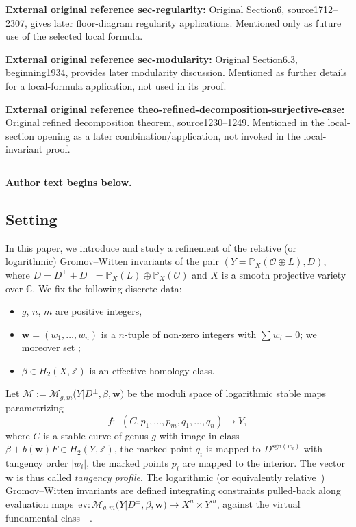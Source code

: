 \documentclass[11pt]{article}
\numberwithin{equation}{section}
\newcommand{\vir}[1]{\big[#1\big]^\mathrm{vir}}
\newcommand{\ev}{\mathrm{ev}}
\newcommand{\PP}{\mathbb{P}}
\newcommand{\ZZ}{\mathbb{Z}}
\newcommand{\bfw}{ {\boldsymbol w} }
\newcommand{\M}{\mathcal{M}}
\renewcommand{\O}{\mathcal{O}}
\numberwithin{equation}{section}
\theoremstyle{definition}
\begin{document}
\noindent\textbf{External original reference sec-regularity:} Original Section6, source1712–2307, gives later floor-diagram regularity applications. Mentioned only as future use of the selected local formula.\par
\noindent\textbf{External original reference sec-modularity:} Original Section6.3, beginning1934, provides later modularity discussion. Mentioned as further details for a local-formula application, not used in its proof.\par
\noindent\textbf{External original reference theo-refined-decomposition-surjective-case:} Original refined decomposition theorem, source1230–1249. Mentioned in the local-section opening as a later combination/application, not invoked in the local-invariant proof.\par
\medskip\hrule\medskip\noindent\textbf{Author text begins below.}\par
\setcounter{section}{1}\setcounter{subsection}{0}
\subsection{Setting}

In this paper, we introduce and study a refinement of the relative (or logarithmic) Gromov--Witten invariants \cite{abramovich2014stable,gross2013logarithmic,kim2010logarithmic,li2001stable} of the pair $(Y=\PP_X(\O\oplus L),D)$, where $D=D^+ + D^-=\PP_X(L)\oplus\PP_X(\O)$ and $X$ is a smooth projective variety over $\mathbb C$. We fix the following discrete data:
\begin{itemize}\itemsep=0pt
 \item $g$, $n$, $m$ are positive integers,
 \item $\bfw=(w_1,\dots,w_n)$ is a $n$-tuple of non-zero integers with $\sum w_i=0$; we moreover set \smash{$b(\bfw)=\sum_{w_i>0}w_i=-\sum_{w_i<0}w_i$};
 \item $\beta\in H_2(X,\ZZ)$ is an effective homology class.
\end{itemize}
Let $\M:=\M_{g,m}\bigl(Y|D^{\pm},\beta,\bfw\bigr)$ be the moduli space of logarithmic stable maps parametrizing
\[
f\colon\ \ (C,p_1,\dots,p_m,q_1,\dots,q_n)\to Y,
 \]
where $C$ is a stable curve of genus $g$ with image in class $\beta+b(\bfw)F\in H_2(Y,\ZZ)$, the marked point $q_i$ is mapped to $D^{\mathrm{sgn}(w_i)}$ with tangency order $|w_i|$, the marked points $p_i$ are mapped to the interior. The vector $\bfw$ is thus called \textit{tangency profile}.
The logarithmic (or equivalently relative~\cite{abramovich2014comparison}) Gromov--Witten invariants are defined integrating constraints pulled-back along evaluation maps~${
\ev \colon \M_{g,m}\bigl(Y|D^{\pm},\beta,\bfw\bigr) \longrightarrow X^n\times Y^m}$,
 against the virtual fundamental class~\smash{$\vir{\M}$}~\cite{gross2013logarithmic}.
\end{document}
